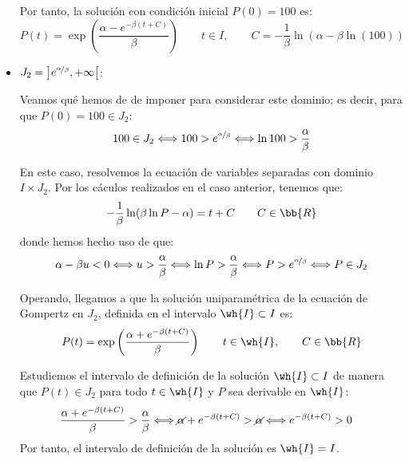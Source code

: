 \begin{ejercicio}
\begin{itemize}
        Por tanto, la solución con condición inicial $P(0)=100$ es:
        \begin{equation*}
            P(t) = \exp\left(\dfrac{\alpha - e^{-\beta(t +C)}}{\beta}\right) \qquad t\in I, \qquad C=-\dfrac{1}{\beta}\ln(\alpha-\beta\ln(100))
        \end{equation*}

        \item \ul{$J_2=\left]e^{\nicefrac{\alpha}{\beta}}, +\infty\right[$}:
        
        Veamos qué hemos de de imponer para considerar este dominio; es decir, para que $P(0)=100\in J_2$:
        \begin{equation*}
            100\in J_2 \Longleftrightarrow 100>e^{\nicefrac{\alpha}{\beta}} \Longleftrightarrow \ln 100 > \dfrac{\alpha}{\beta}
        \end{equation*}

        En este caso, resolvemos la ecuación de variables separadas con dominio $I\times J_2$.
        Por los cáculos realizados en el caso anterior, tenemos que:
        \begin{equation*}
            -\dfrac{1}{\beta} \ln(\beta \ln P-\alpha) = t + C \qquad C\in \bb{R}
        \end{equation*}
        donde hemos hecho uso de que:
        \begin{equation*}
            \alpha-\beta u<0\Longleftrightarrow
            u>\dfrac{\alpha}{\beta}\Longleftrightarrow
            \ln P>\dfrac{\alpha}{\beta}\Longleftrightarrow
            P>e^{\nicefrac{\alpha}{\beta}} \Longleftrightarrow P\in J_2
        \end{equation*}

        Operando, llegamos a que la solución uniparamétrica de la ecuación de Gompertz en $J_2$, definida en el intervalo $\wh{I}\subset I$ es:
        \begin{equation*}
            P(t) = \exp\left(\dfrac{\alpha + e^{-\beta(t + C)}}{\beta}\right) \qquad t\in \wh{I},\qquad C\in \bb{R}
        \end{equation*}

        Estudiemos el intervalo de definición de la solución $\wh{I}\subset I$ de manera que $P(t)\in J_2$ para todo $t\in \wh{I}$ y $P$ sea derivable en $\wh{I}$:
        \begin{align*}
            \dfrac{\alpha+e^{-\beta(t+C)}}{\beta}&>\frac{\alpha}{\beta}\Longleftrightarrow
            \cancel{\alpha}+e^{-\beta(t+C)}>\cancel{\alpha}
            \Longleftrightarrow
            e^{-\beta(t+C)}>0
        \end{align*}
        Por tanto, el intervalo de definición de la solución es $\wh{I}=I$.


\end{itemize}
\end{ejercicio}
